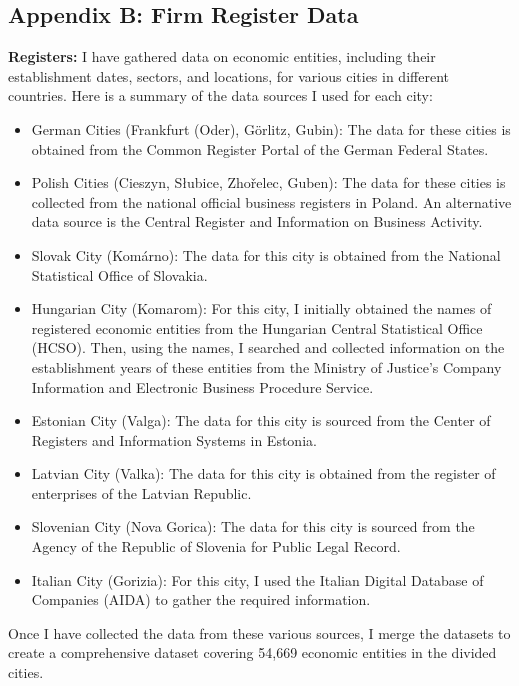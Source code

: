 \documentclass[12pt]{article}    %
\begin{document}
\newpage
\subsection{Appendix B: Firm Register Data}
\par \textbf{Registers:} I have gathered data on economic entities, including their establishment dates, sectors, and locations, for various cities in different countries. Here is a summary of the data sources I used for each city:
\begin{itemize}
\item  German Cities (Frankfurt (Oder), Görlitz, Gubin): The data for these cities is obtained from the Common Register Portal of the German Federal States.
\item  Polish Cities (Cieszyn, Słubice, Zhořelec, Guben): The data for these cities is collected from the national official business registers in Poland. An alternative data source is the Central Register and Information on Business Activity.
\item  Slovak City (Komárno): The data for this city is obtained from the National Statistical Office of Slovakia.
\item  Hungarian City (Komarom): For this city, I initially obtained the names of registered economic entities from the Hungarian Central Statistical Office (HCSO). Then, using the names, I searched and collected information on the establishment years of these entities from the Ministry of Justice's Company Information and Electronic Business Procedure Service.
\item  Estonian City (Valga): The data for this city is sourced from the Center of Registers and Information Systems in Estonia.
\item  Latvian City (Valka): The data for this city is obtained from the register of enterprises of the Latvian Republic.
\item  Slovenian City (Nova Gorica): The data for this city is sourced from the Agency of the Republic of Slovenia for Public Legal Record.
\item  Italian City (Gorizia): For this city, I used the Italian Digital Database of Companies (AIDA) to gather the required information.
\end{itemize}

Once I have collected the data from these various sources, I merge the datasets to create a comprehensive dataset covering 54,669 economic entities in the divided cities. 
\end{document}

